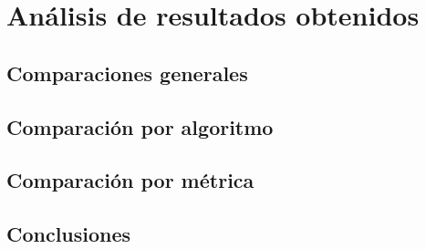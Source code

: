
\chapter{Análisis de resultados obtenidos}
\label{cap:analisis}


\section{Comparaciones generales}
\label{analisis:compgeneral}
 
\section{Comparación por algoritmo}
\label{analisis:compalgoritmo}


\section{Comparación por métrica}
\label{analisis:compmetrica}

 

\section{Conclusiones}
\label{analisis:conclusiones}